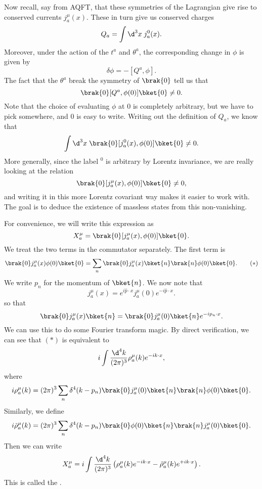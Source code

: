 \documentclass[a4paper]{article}
\begin{document}
Now recall, say from AQFT, that these symmetries of the Lagrangian give rise to conserved currents $j_a^\mu(x)$. These in turn give us conserved charges
\[
  Q_a = \int \d^3 x\; j^0_a (x).
\]
Moreover, under the action of the $t^a$ and $\theta^a$, the corresponding change in $\phi$ is given by
\[
  \delta \phi = -[Q^a, \phi].
\]
The fact that the $\theta^a$ break the symmetry of $\brak{0}$ tell us that
\[
  \brak{0}[Q^a, \phi(0)] \bket{0} \not= 0.
\]
Note that the choice of evaluating $\phi$ at $0$ is completely arbitrary, but we have to pick somewhere, and $0$ is easy to write. Writing out the definition of $Q_a$, we know that
\[
  \int \d^3 x\; \brak{0} [j_a^0(x), \phi(0)] \bket{0} \not= 0.
\]
More generally, since the label $^0$ is arbitrary by Lorentz invariance, we are really looking at the relation
\[
  \brak{0} [j_a^\mu (x), \phi(0)] \bket{0} \not= 0,
\]
and writing it in this more Lorentz covariant way makes it easier to work with. The goal is to deduce the existence of massless states from this non-vanishing.

For convenience, we will write this expression as
\[
  X_a^\mu =  \brak{0} [j_a^\mu (x), \phi(0)] \bket{0}.
\]
We treat the two terms in the commutator separately. The first term is
\[
  \brak{0} j_a^\mu (x) \phi(0) \bket{0} = \sum_n \brak{0}j_a^\mu (x) \bket{n} \brak{n}\phi(0) \bket{0}.\tag{$*$}
\]
We write $p_n$ for the momentum of $\bket{n}$. We now note that
\[
  j_a^\mu (x) = e^{i\hat{p} \cdot x} j_a^\mu (0) e^{-i\hat{p} \cdot x}.
\]
so that
\[
  \brak{0}j_a^\mu(x) \bket{n} = \brak{0} j_a^\mu(0) \bket{n} e^{-ip_n \cdot x}.
\]
We can use this to do some Fourier transform magic. By direct verification, we can see that $(*)$ is equivalent to
\[
  i \int \frac{\d^4 k}{(2\pi)^3} \rho_a^\mu(k) e^{-ik\cdot x},
\]
where
\[
  i \rho_a^\mu (k) = (2\pi)^3 \sum_n \delta^4(k - p_n)\brak{0}j_a^\mu(0) \bket{n} \brak{n}\phi(0)\bket{0}.
\]
Similarly, we define
\[
  i \tilde{\rho}_a^\mu (k) = (2\pi)^3 \sum_n \delta^4(k - p_n) \brak{0} \phi(0) \bket{n} \brak{n} j_a^\mu (0) \bket{0}.
\]
Then we can write
\[
  X_a^\mu = i \int \frac{\d^4 k}{(2\pi)^3}\left(\rho_a^\mu (k) e^{-ik\cdot x} - \tilde{\rho}_a^\mu(k) e^{+ik\cdot x}\right).
\]
This is called the .
\end{document}

